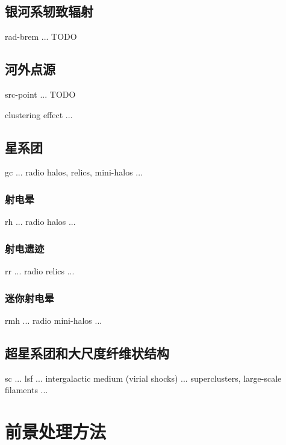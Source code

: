 \subsection{银河系轫致辐射}

\ac{rad-brem} ...
TODO

\subsection{河外点源}

\ac{src-point} ...
TODO

clustering effect ...

\subsection{星系团}

\ac{gc} ...
radio halos, relics, mini-halos ...

\subsubsection{射电晕}

\ac{rh} ...
radio halos ...

\subsubsection{射电遗迹}

\ac{rr} ...
radio relics ...

\subsubsection{迷你射电晕}

\ac{rmh} ...
radio mini-halos ...

\subsection{超星系团和大尺度纤维状结构}

\ac{sc} ...
\ac{lsf} ...
intergalactic medium (virial shocks) ...
superclusters, large-scale filaments ...


\section{前景处理方法}
\label{sec:fg-methods}


